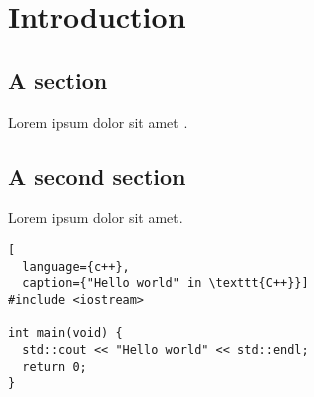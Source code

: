 \chapter{Introduction}
\section{A section}
Lorem ipsum dolor sit amet \cite{smit54}.

\newpage
\section{A second section}
Lorem ipsum dolor sit amet.
\begin{lstlisting}[
  language={c++}, 
  caption={"Hello world" in \texttt{C++}}]
#include <iostream>

int main(void) {
  std::cout << "Hello world" << std::endl;
  return 0;
}
\end{lstlisting}
